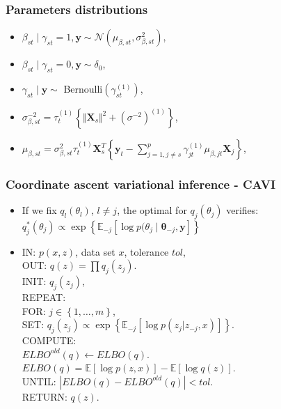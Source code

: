 \documentclass{beamer}
\begin{document}
\begin{frame}
\frametitle{Parameters distributions}
\begin{itemize}
\item $\beta_{st} \mid \gamma_{st} = 1, \boldsymbol{y} \sim \mathcal{N}\left(\mu_{\beta,st},\sigma_{\beta,st}^2\right)$,
\item $\beta_{st} \mid \gamma_{st} = 0, \boldsymbol{y} \sim \delta_0$,
\item $\gamma_{st} \mid \boldsymbol{y} \sim $ Bernoulli$(\gamma_{st}^{(1)})$,
\vspace{2em}
\item $\sigma^{-2}_{\beta,st} = \tau_t^{(1)}\left\lbrace \Vert \boldsymbol{X}_s \Vert^2 + (\sigma^{-2})^{(1)}\right\rbrace $,
\item $\mu_{\beta,st}=\sigma^2_{\beta,st}\tau^{(1)}_t\boldsymbol{X}_s^T\left\lbrace\boldsymbol{y}_t - \sum_{j=1, j \neq s}^p \gamma_{jt}^{(1)}\mu_{\beta,jt}\boldsymbol{X}_j\right\rbrace $,
\end{itemize}
\end{frame}

\begin{frame}
\frametitle{Coordinate ascent variational inference - CAVI}
\begin{itemize}
\item If we fix $q_l(\theta_l)$, $l \neq j$, the optimal for $q_j(\theta_j)$ verifies: $q^*_j(\theta_j) \propto \exp\left\lbrace\mathbb{E}_{-j}\left[\log p(\theta_j \mid \boldsymbol{\theta}_{-j},\boldsymbol{y}\right]\right\rbrace$
\item \begin{text}
IN: $p(x,z)$, data set $x$, tolerance $tol$,\\
OUT: $q(z) = \prod q_j(z_j)$.\\
INIT: $q_j(z_j)$, \\
REPEAT:\\
\quad FOR: $j \in \left\lbrace1, \dots, m\right\rbrace$,\\
\quad \quad SET: $q_j(z_j) \propto \exp\left\lbrace\mathbb{E}_{-j}\left[\log p(z_j|z_{-j},x)\right]\right\rbrace$.\\
\quad COMPUTE:\\
\quad \quad $ELBO^{old}(q) \leftarrow ELBO(q)$.\\
\quad \quad $ELBO(q) = \mathbb{E}\left[\log p(z,x)\right] - \mathbb{E}\left[\log q(z) \right] $.\\
UNTIL: $|ELBO(q)-ELBO^{old}(q)|<tol$.\\
RETURN: $q(z).$
\end{text}
\end{itemize}
\end{frame}
\end{document}
